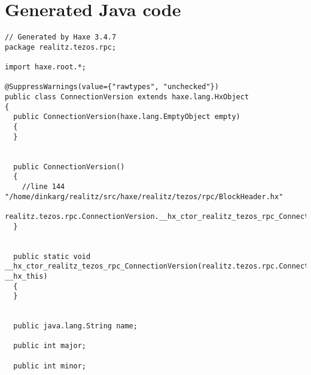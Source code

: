 \documentclass{article}
\begin{document}
\section{Generated Java code}
\begin{lstlisting}
// Generated by Haxe 3.4.7
package realitz.tezos.rpc;

import haxe.root.*;

@SuppressWarnings(value={"rawtypes", "unchecked"})
public class ConnectionVersion extends haxe.lang.HxObject
{
  public ConnectionVersion(haxe.lang.EmptyObject empty)
  {
  }
  
  
  public ConnectionVersion()
  {
    //line 144 "/home/dinkarg/realitz/src/haxe/realitz/tezos/rpc/BlockHeader.hx"
    realitz.tezos.rpc.ConnectionVersion.__hx_ctor_realitz_tezos_rpc_ConnectionVersion(this);
  }
  
  
  public static void __hx_ctor_realitz_tezos_rpc_ConnectionVersion(realitz.tezos.rpc.ConnectionVersion __hx_this)
  {
  }
  
  
  public java.lang.String name;
  
  public int major;
  
  public int minor;
  
\end{lstlisting}
\end{document}
